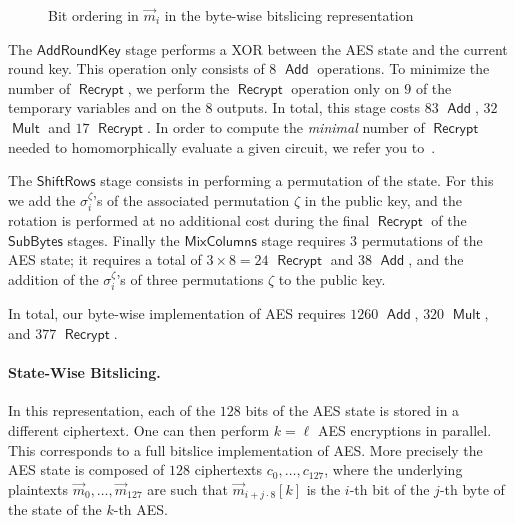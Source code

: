 \documentclass[11pt]{llncs}
\DeclareMathOperator{\Recrypt}{\ensuremath{\mathsf{Recrypt}}}
\DeclareMathOperator{\Add}{\ensuremath{\mathsf{Add}}}
\DeclareMathOperator{\Mult}{\ensuremath{\mathsf{Mult}}}
\newcommand*\AddRoundKey{\ensuremath{\mathsf{AddRoundKey}}}
\newcommand*\ShiftRows{\ensuremath{\mathsf{ShiftRows}}}
\newcommand*\SubBytes{\ensuremath{\mathsf{SubBytes}}}
\newcommand*\MixColumns{\ensuremath{\mathsf{MixColumns}}}
\newcommand*\bwbs{byte-wise bitslicing\xspace}
\begin{document}
\begin{figure}[bt]
  \caption{Bit ordering in $\vec m_i$ in the \bwbs{} representation}
  \label{fig:bwbs-state}
\end{figure}

The $\AddRoundKey$ stage performs a XOR between the AES state and the
current round key. This operation only consists of $8$ $\Add$
operations.  
To minimize the
number of $\Recrypt$, we perform the $\Recrypt$ operation only on $9$ of
the temporary variables and on the $8$ outputs. In total, this stage
costs $83$ $\Add$, $32$ $\Mult$ and $17$
$\Recrypt$. In order to compute the \emph{minimal} number of $\Recrypt$ needed to homomorphically evaluate a given circuit, we refer you to~\cite{LP2013}.

The $\ShiftRows$ stage consists in performing a permutation of the
state. For this we add the $\sigma^\zeta_i$'s of the associated
permutation $\zeta$ in the public key, and the rotation is performed 
at no additional cost during the final $\Recrypt$ of the $\SubBytes$
stages. 
Finally the $\MixColumns$ stage requires $3$ permutations of the AES
state; it requires a total of $3\times 8=24$ $\Recrypt$
and $38$ $\Add$, and the addition of the $\sigma^\zeta_i$'s of
three permutations $\zeta$ to the public key. 

In total, our byte-wise implementation of AES requires  $1260$ $\Add$,
 $320$ $\Mult$, and $377$ $\Recrypt$.

\paragraph{State-Wise Bitslicing.} In this representation, each of the
$128$ bits of the AES state is stored in a different ciphertext. One
can then perform $k=\ell$ AES encryptions in parallel. This
corresponds to a full bitslice implementation of AES.
More precisely
the AES state is composed of $128$ ciphertexts $c_0,\ldots,c_{127}$,
where the underlying plaintexts $\vec m_0,\ldots,\vec m_{127}$ are
such that $\vec m_{i+j\cdot 8}[k]$ is the $i$-th bit of the $j$-th
byte of the state of the $k$-th AES.
\end{document}
